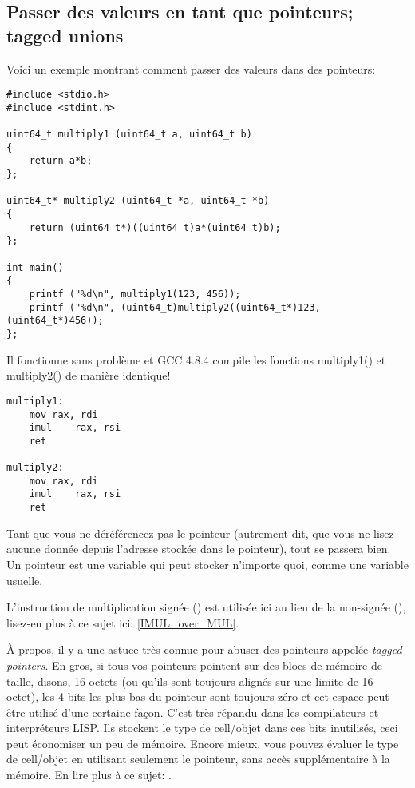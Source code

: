 \subsection{Passer des valeurs en tant que pointeurs; tagged unions}

Voici un exemple montrant comment passer des valeurs dans des pointeurs:

\begin{lstlisting}[label=unsigned_multiply_C,style=customc]
#include <stdio.h>
#include <stdint.h>

uint64_t multiply1 (uint64_t a, uint64_t b)
{
	return a*b;
};

uint64_t* multiply2 (uint64_t *a, uint64_t *b)
{
	return (uint64_t*)((uint64_t)a*(uint64_t)b);
};

int main()
{
	printf ("%d\n", multiply1(123, 456));
	printf ("%d\n", (uint64_t)multiply2((uint64_t*)123, (uint64_t*)456));
};
\end{lstlisting}

Il fonctionne sans problème et GCC 4.8.4 compile les fonctions multiply1() et multiply2()
de manière identique!

\begin{lstlisting}[label=unsigned_multiply_lst,style=customasmx86]
multiply1:
	mov	rax, rdi
	imul	rax, rsi
	ret

multiply2:
	mov	rax, rdi
	imul	rax, rsi
	ret
\end{lstlisting}

Tant que vous ne déréférencez pas le pointeur (autrement dit, que vous ne lisez aucune
donnée depuis l'adresse stockée dans le pointeur), tout se passera bien.
Un pointeur est une variable qui peut stocker n'importe quoi, comme une variable
usuelle.

L'instruction de multiplication signée (\IMUL) est utilisée ici au lieu de la non-signée
(\MUL), lisez-en plus à ce sujet ici:
\ref{IMUL_over_MUL}.

À propos, il y a une astuce très connue pour abuser des pointeurs appelée \emph{tagged pointers}.
En gros, si tous vos pointeurs pointent sur des blocs de mémoire de taille, disons,
16 octets (ou qu'ils sont toujours alignés sur une limite de 16-octet), les 4 bits
les plus bas du pointeur sont toujours zéro et cet espace peut être utilisé d'une
certaine façon.
C'est très répandu dans les compilateurs et interpréteurs LISP.
Ils stockent le type de cell/objet dans ces bits inutilisés, ceci peut économiser
un peu de mémoire.
Encore mieux, vous pouvez évaluer le type de cell/objet en utilisant seulement le pointeur,
sans accès supplémentaire à la mémoire.
En lire plus à ce sujet: .

